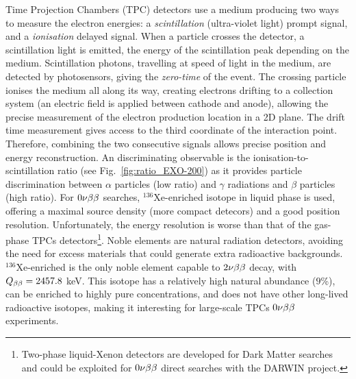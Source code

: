 Time Projection Chambers (TPC) detectors use a medium producing two ways to measure the electron energies: a \emph{scintillation} (ultra-violet light) prompt signal, and a \emph{ionisation} delayed signal.
When a particle crosses the detector, a scintillation light is emitted, the energy of the scintillation peak depending on the medium.
Scintillation photons, travelling at speed of light in the medium, are detected by photosensors, giving the \emph{zero-time} of the event.
The crossing particle ionises the medium all along its way, creating electrons drifting to a collection system (an electric field is applied between cathode and anode), allowing the precise measurement of the electron production location in a 2D plane.
The drift time measurement gives access to the third coordinate of the interaction point.
Therefore, combining the two consecutive signals allows precise position and energy reconstruction.
An discriminating observable is the ionisation-to-scintillation ratio (see Fig.~\ref{fig:ratio_EXO-200}) as it provides particle discrimination between $\alpha$ particles (low ratio) and $\gamma$ radiations and $\beta$ particles (high ratio).
For $0\nu\beta\beta$ searches, $^{136}$Xe-enriched isotope in liquid phase is used, offering a maximal source density (more compact detecors) and a good position resolution.
Unfortunately, the energy resolution is worse than that of the gas-phase TPCs detectors\footnote{Two-phase liquid-Xenon detectors are developed for Dark Matter searches and could be exploited for $0\nu\beta\beta$ direct searches with the DARWIN project.}.
Noble elements are natural radiation detectors, avoiding the need for excess materials that could generate extra radioactive backgrounds.
$^{136}$Xe-enriched is the only noble element capable to $2\nu\beta\beta$ decay, with $Q_{\beta\beta}=2457.8$ keV.
This isotope has a relatively high natural abundance ($9$\%), can be enriched to highly pure concentrations, and does not have other long-lived radioactive isotopes, making it interesting for large-scale TPCs $0\nu\beta\beta$ experiments.\\

